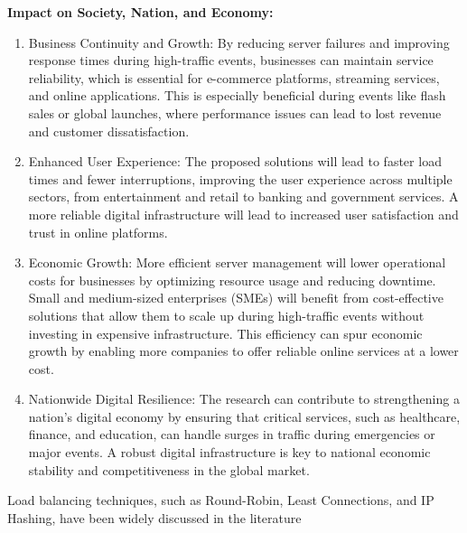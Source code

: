 \documentclass[a4paper, 12pt]{article}
\begin{document}
\textbf{ Impact on Society, Nation, and Economy:}

\begin{enumerate}
    \item Business Continuity and Growth: By reducing server failures and improving response times during high-traffic events, businesses can maintain service reliability, which is essential for e-commerce platforms, streaming services, and online applications. This is especially beneficial during events like flash sales or global launches, where performance issues can lead to lost revenue and customer dissatisfaction.
    \item Enhanced User Experience: The proposed solutions will lead to faster load times and fewer interruptions, improving the user experience across multiple sectors, from entertainment and retail to banking and government services. A more reliable digital infrastructure will lead to increased user satisfaction and trust in online platforms.
    \item Economic Growth: More efficient server management will lower operational costs for businesses by optimizing resource usage and reducing downtime. Small and medium-sized enterprises (SMEs) will benefit from cost-effective solutions that allow them to scale up during high-traffic events without investing in expensive infrastructure. This efficiency can spur economic growth by enabling more companies to offer reliable online services at a lower cost.
    \item Nationwide Digital Resilience: The research can contribute to strengthening a nation’s digital economy by ensuring that critical services, such as healthcare, finance, and education, can handle surges in traffic during emergencies or major events. A robust digital infrastructure is key to national economic stability and competitiveness in the global market.
    
\end{enumerate}




\cite{Alzoubi2021}
\cite{lorido2014}
\cite{sanchez2011}
\cite{robinson2017}
\cite{prusty2018}
Load balancing techniques, such as Round-Robin, Least Connections, and IP Hashing, have been widely discussed in the literature \cite{Sethi2016, Alakeel2010}
\end{document}
